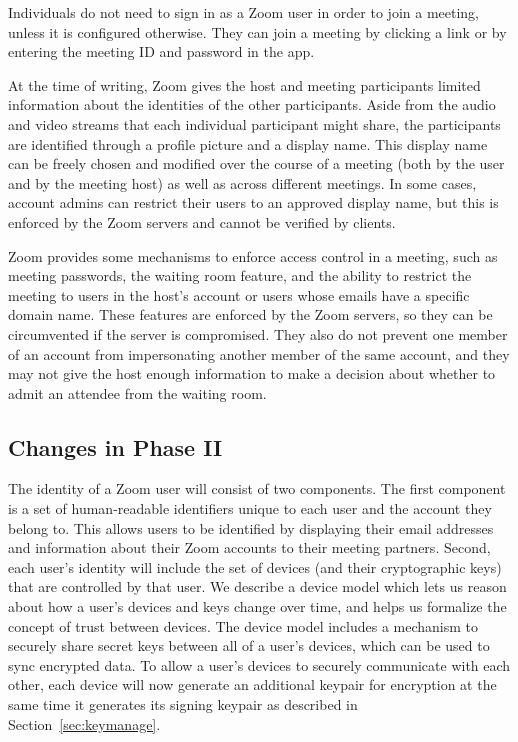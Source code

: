 Individuals do not need to sign in as a Zoom user in order to join a meeting, unless it is
configured otherwise. They can join a meeting by clicking a link or by entering the meeting ID and
password in the app.

At the time of writing, Zoom gives the host and meeting participants limited information about the
identities of the other participants. Aside from the audio and video streams that each individual
participant might share, the participants are identified through a profile picture and
a display name. This display name can be freely chosen and modified over the course of
a meeting (both by the user and by the meeting host) as well as across different meetings. In some
cases, account admins can restrict their users to an approved display name, but this is enforced by
the Zoom servers and cannot be verified by clients.

Zoom provides some mechanisms to enforce access control in a meeting, such as meeting passwords, the
waiting room feature, and the ability to restrict the meeting to users in the host's account or
users whose emails have a specific domain name. These features are enforced by the Zoom servers, so
they can be circumvented if the server is compromised. They also do not prevent one member of an
account from impersonating another member of the same account, and they may not give the host
enough information to make a decision about whether to admit an attendee from the waiting room.

\subsection{Changes in Phase II}

The identity of a Zoom user will consist of two components. The first component is a set of
human-readable identifiers unique to each user and the account they belong to. This allows users to
be identified by displaying their email addresses and information about their Zoom accounts to their
meeting partners. Second, each user's identity will include the set of devices (and their
cryptographic keys) that are controlled by that user. We describe a device model which lets us reason
about how a user's devices and keys change over time, and helps us formalize the concept of trust
between devices. The device model includes a mechanism to securely share secret keys between all of
a user's devices, which can be used to sync encrypted data. To allow a user's devices to securely
communicate with each other, each device will now generate an additional keypair for encryption at
the same time it generates its signing keypair as described in Section~\ref{sec:keymanage}.


